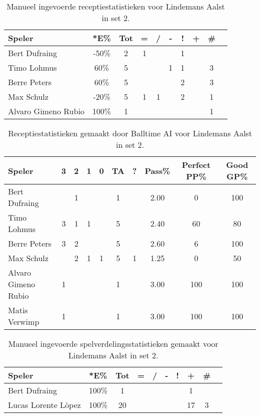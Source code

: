
\begin{table}[ht!]
    \centering
    \scriptsize
    \begin{tabular}{|l|c|c|c|c|c|c|c|c|c|}
        \hline
        \textbf{Speler} & *E\% & Tot & = & / & - & ! & + & \# \\ \hline
        Bert Dufraing & -50\% & 2 & 1 &  & & 1 &  &  \\ 
        Timo Lohmus & 60\% & 5 &  &  & 1 & 1 & & 3 \\ 
        Berre Peters & 60\% & 5 &  &  &  & 2 & & 3 \\ 
        Max Schulz & -20\% & 5 & 1 & 1 & & 2 &  & 1 \\
        Alvaro Gimeno Rubio & 100\% & 1 &  &  &  & &  & 1 \\ \hline
    \end{tabular}
  \caption[Manueel ingevoerde receptiestatistieken voor Lindemans Aalst in set 2]{\label{tab:PL3ReceiveAalstMan2}Manueel ingevoerde receptiestatistieken voor Lindemans Aalst in set 2.}
\end{table}

\begin{table}[ht!]
  \centering
  \scriptsize
  \begin{tabular}{|l|c|c|c|c|c|c|c|c|c|} \hline
    \textbf{Speler} & 3 & 2 & 1 & 0 & TA & ? & Pass\% & Perfect PP\% & Good GP\% \\ \hline
    Bert Dufraing &  &  1 &  &  & 1 &  & 2.00 & 0 & 100 \\
    Timo Lohmus & 3 & 1 & 1 &   & 5 &  & 2.40 & 60 & 80 \\
    Berre Peters & 3 & 2 &   &  & 5 &  & 2.60 & 6 & 100 \\
    Max Schulz &   & 2 & 1 & 1 & 5 & 1 & 1.25 & 0 & 50  \\
    Alvaro Gimeno Rubio & 1 &   &   &  & 1 &  & 3.00 & 100 & 100 \\
    Matis Verwimp & 1 &   &   &  & 1 &  & 3.00 & 100 & 100 \\ \hline
  \end{tabular}
  \caption[Receptiestatistieken gemaakt door Balltime AI voor Lindemans Aalst in set 2]{\label{tab:PL3ReceiveAalstAI2}Receptiestatistieken gemaakt door Balltime AI voor Lindemans Aalst in set 2.}
\end{table}


\begin{table}[ht!]
    \centering
    \scriptsize
    \begin{tabular}{|l|c|c|c|c|c|c|c|c|c|}
        \hline
        \textbf{Speler} & *E\% & Tot & = & / & - & ! & + & \# \\ \hline
        Bert Dufraing & 100\% & 1 &  &  & &  & 1 & \\ 
        Lucas Lorente Lòpez & 100\% & 20 &  &  & & & 17 & 3 \\ \hline
    \end{tabular}
    \caption[Manueel ingevoerde spelverdelingsstatistieken gemaakt voor Lindemans Aalst in set 2]{\label{tab:PL3SetAalstMan2}Manueel ingevoerde spelverdelingsstatistieken gemaakt voor Lindemans Aalst in set 2.}
\end{table}


